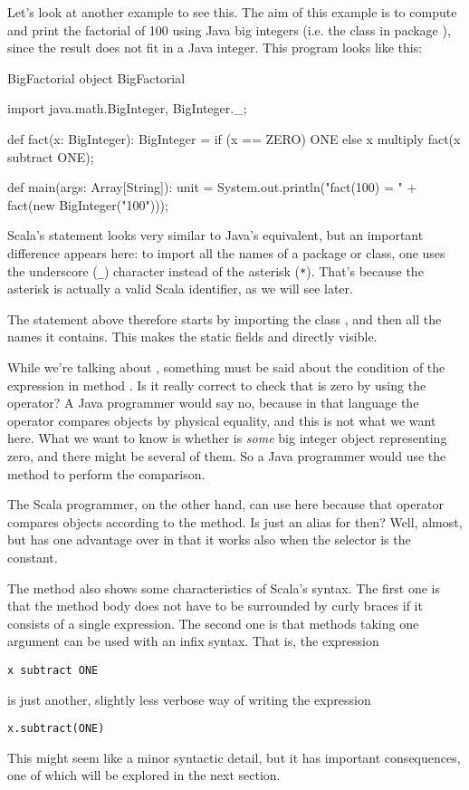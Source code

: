 \documentclass[a4paper,12pt,twoside,titlepage]{article}
\newcommand{\langname}[1]{#1\xspace}
\newcommand{\Scala}{\langname{Scala}}
\newcommand{\Java}{\langname{Java}}
\begin{document}
Let's look at another example to see this. The aim of this example is
to compute and print the factorial of 100 using \Java big integers
(i.e. the class  in package ),
since the result does not fit in a \Java integer. This program looks
like this:
\begin{scalaprogram}{BigFactorial}
object BigFactorial {
  import java.math.BigInteger, BigInteger._;

  def fact(x: BigInteger): BigInteger =
    if (x == ZERO) ONE
    else x multiply fact(x subtract ONE);

  def main(args: Array[String]): unit =
    System.out.println("fact(100) = "
                       + fact(new BigInteger("100")));
}
\end{scalaprogram}

\Scala's  statement looks very similar to \Java's
equivalent, but an important difference appears here: to import all
the names of a package or class, one uses the underscore (\verb|_|)
character instead of the asterisk (\verb|*|). That's because the
asterisk is actually a valid \Scala identifier, as we will see later.

The  statement above therefore starts by importing the
class , and then all the names it
contains. This makes the static fields  and 
directly visible.

While we're talking about , something must be said about
the condition of the  expression in method . Is
it really correct to check that  is zero by using the
\code{==} operator? A \Java programmer would say no, because in that
language the \code{==} operator compares objects by physical
equality, and this is not what we want here. What we want to know is
whether  is \emph{some} big integer object representing zero,
and there might be several of them. So a \Java programmer would use
the  method to perform the comparison.

The \Scala programmer, on the other hand, can use \code{==} here
because that operator compares objects according to the 
method. Is \code{==} just an alias for  then? Well,
almost, but \code{==} has one advantage over  in that
it works also when the selector is the  constant.

The  method also shows some characteristics of \Scala's
syntax. The first one is that the method body does not have to be
surrounded by curly braces if it consists of a single expression.
The second one is that methods taking one argument can be used with an
infix syntax. That is, the expression
\begin{lstlisting}
x subtract ONE
\end{lstlisting}
is just another, slightly less verbose way of writing the expression
\begin{lstlisting}
x.subtract(ONE)
\end{lstlisting}
This might seem like a minor syntactic detail, but it has important
consequences, one of which will be explored in the next section.
\end{document}
